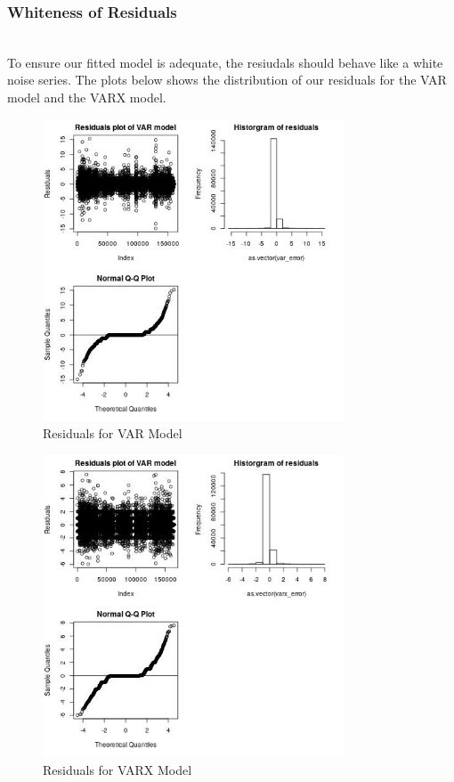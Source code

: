 \documentclass[nonblindrev,msom]{informs3} %
\begin{document}
\subsubsection{Whiteness of Residuals}
\hfill\\
To ensure our fitted model is adequate, the resiudals should behave like a white noise series. 
The plots below shows the distribution of our residuals for the VAR model and the VARX model. 

\begin{figure}[H]
    \centering
    \includegraphics[width=0.8\textwidth, height=0.42\textheight]{Images/Full_VAR_diff_resids.jpg}
    \caption{Residuals for VAR Model}
    \label{fig:Residuals for VAR Model}
\end{figure}

\newpage
\begin{figure}[H]
    \centering
    \includegraphics[width=0.8\textwidth, height=0.42\textheight]{Images/Full_VARX_diff_resids.jpg}
    \caption{Residuals for VARX Model}
    \label{fig:Residuals for VARX Model}
\end{figure}
\end{document}

